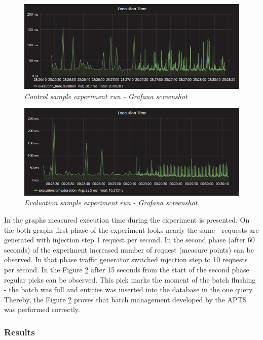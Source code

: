 \documentclass[10pt,a4paper]{article}
\begin{document}
\begin{figure}[!htb]
\centering
\includegraphics[width=1\textwidth]{batchCtrl}
\caption{\textit{Control sample experiment run - Grafana screenshot}} \label{batchevaluationscreencontrol}
\end{figure}
\begin{figure}[!htb]
\centering
\includegraphics[width=1\textwidth]{batchEval}
\caption{\textit{Evaluation sample experiment run - Grafana screenshot}} \label{batchevaluationscreenevaluation}
\end{figure}

In the graphs measured execution time during the experiment is presented. On the both graphs first phase of the experiment looks nearly the same - requests are generated with injection step 1 request per second. In the second phase (after 60 seconds) of the experiment increased number of request (measure points) can be observed. In that phase traffic generator switched injection step to 10 requests per second. In the Figure \ref{batchevaluationscreenevaluation} after 15 seconds from the start of the second phase regular picks can be observed. This pick marks the moment of the batch flushing - the batch was full and entities was inserted into the database in the one query. Thereby, the Figure \ref{batchevaluationscreenevaluation} proves that batch management developed by the APTS was performed correctly. 

\subsubsection{Results} \label{section:batchresults}
\end{document}
